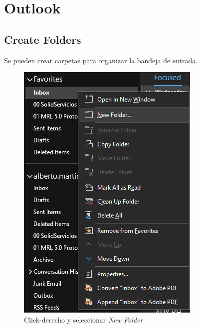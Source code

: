 \documentclass[12pt,letterpaper,final]{report}
\begin{document}
\part{Outlook}

\chapter{Create Folders}

Se pueden crear carpetas para organizar la bandeja de entrada.

\begin{figure}[H]
	\centering
	\includegraphics[width=0.85\linewidth, height=0.5\textheight,keepaspectratio]{Imagenes/outlook_createfolders01}
	\caption{Click-derecho y seleccionar \emph{New Folder}}
	\label{fig:outlookcreatefolders01}
\end{figure}
\end{document}
